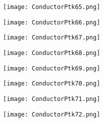 \documentclass[pdf]{beamer}
\begin{document}
\begin{frame}
\begin{figure}[!h]
\centering
\texttt{[image: ConductorPtk65.png]}
\end{figure}
\end{frame}

\begin{frame}
\begin{figure}[!h]
\centering
\texttt{[image: ConductorPtk66.png]}
\end{figure}
\end{frame}

\begin{frame}
\begin{figure}[!h]
\centering
\texttt{[image: ConductorPtk67.png]}
\end{figure}
\end{frame}

\begin{frame}
\begin{figure}[!h]
\centering
\texttt{[image: ConductorPtk68.png]}
\end{figure}
\end{frame}

\begin{frame}
\begin{figure}[!h]
\centering
\texttt{[image: ConductorPtk69.png]}
\end{figure}
\end{frame}

\begin{frame}
\begin{figure}[!h]
\centering
\texttt{[image: ConductorPtk70.png]}
\end{figure}
\end{frame}

\begin{frame}
\begin{figure}[!h]
\centering
\texttt{[image: ConductorPtk71.png]}
\end{figure}
\end{frame}

\begin{frame}
\begin{figure}[!h]
\centering
\texttt{[image: ConductorPtk72.png]}
\end{figure}
\end{frame}
\end{document}

